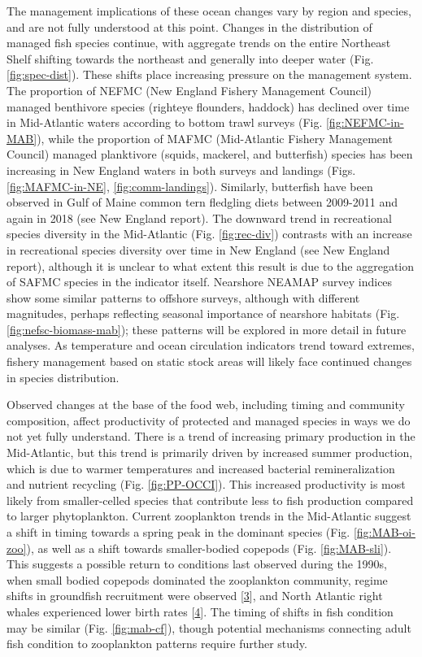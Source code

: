 \documentclass[10pt,]{article}
\begin{document}
The management implications of these ocean changes vary by region and
species, and are not fully understood at this point. Changes in the
distribution of managed fish species continue, with aggregate trends on
the entire Northeast Shelf shifting towards the northeast and generally
into deeper water (Fig. \ref{fig:spec-dist}). These shifts place
increasing pressure on the management system. The proportion of NEFMC
(New England Fishery Management Council) managed benthivore species
(righteye flounders, haddock) has declined over time in Mid-Atlantic
waters according to bottom trawl surveys (Fig. \ref{fig:NEFMC-in-MAB}),
while the proportion of MAFMC (Mid-Atlantic Fishery Management Council)
managed planktivore (squids, mackerel, and butterfish) species has been
increasing in New England waters in both surveys and landings (Figs.
\ref{fig:MAFMC-in-NE}, \ref{fig:comm-landings}). Similarly, butterfish
have been observed in Gulf of Maine common tern fledgling diets between
2009-2011 and again in 2018 (see New England report). The downward trend
in recreational species diversity in the Mid-Atlantic (Fig.
\ref{fig:rec-div}) contrasts with an increase in recreational species
diversity over time in New England (see New England report), although it
is unclear to what extent this result is due to the aggregation of SAFMC
species in the indicator itself. Nearshore NEAMAP survey indices show
some similar patterns to offshore surveys, although with different
magnitudes, perhaps reflecting seasonal importance of nearshore habitats
(Fig. \ref{fig:nefsc-biomass-mab}); these patterns will be explored in
more detail in future analyses. As temperature and ocean circulation
indicators trend toward extremes, fishery management based on static
stock areas will likely face continued changes in species distribution.

Observed changes at the base of the food web, including timing and
community composition, affect productivity of protected and managed
species in ways we do not yet fully understand. There is a trend of
increasing primary production in the Mid-Atlantic, but this trend is
primarily driven by increased summer production, which is due to warmer
temperatures and increased bacterial remineralization and nutrient
recycling (Fig. \ref{fig:PP-OCCI}). This increased productivity is most
likely from smaller-celled species that contribute less to fish
production compared to larger phytoplankton. Current zooplankton trends
in the Mid-Atlantic suggest a shift in timing towards a spring peak in
the dominant species (Fig. \ref{fig:MAB-oi-zoo}), as well as a shift
towards smaller-bodied copepods (Fig. \ref{fig:MAB-sli}). This suggests
a possible return to conditions last observed during the 1990s, when
small bodied copepods dominated the zooplankton community, regime shifts
in groundfish recruitment were observed
{[}\protect\hyperlink{ref-perretti_regime_2017}{3}{]}, and North
Atlantic right whales experienced lower birth rates
{[}\protect\hyperlink{ref-greene_remote_2013}{4}{]}. The timing of
shifts in fish condition may be similar (Fig. \ref{fig:mab-cf}), though
potential mechanisms connecting adult fish condition to zooplankton
patterns require further study.
\end{document}
